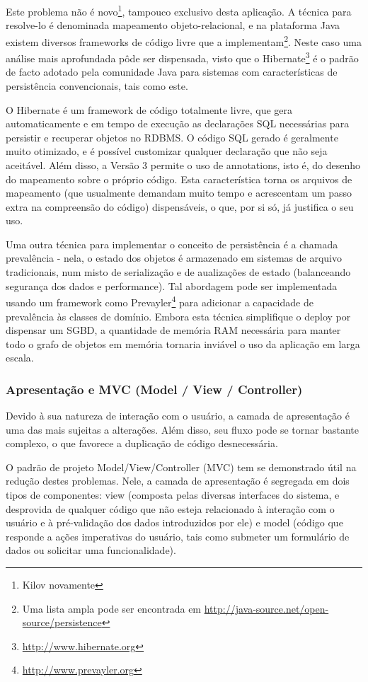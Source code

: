 \documentclass{abnt}
\begin{document}
Este problema não é novo\footnote{Kilov novamente}, tampouco exclusivo desta aplicação. A técnica para resolve-lo é denominada mapeamento objeto-relacional, e na plataforma Java existem diversos frameworks de código livre que a implementam\footnote{Uma lista ampla pode ser encontrada em \url{http://java-source.net/open-source/persistence}}. Neste caso uma análise mais aprofundada pôde ser dispensada, visto que o Hibernate\footnote{\url{http://www.hibernate.org}} é o padrão de facto adotado pela comunidade Java para sistemas com características de persistência convencionais, tais como este.

O Hibernate é um framework de código totalmente livre, que gera automaticamente e em tempo de execução as declarações SQL necessárias para persistir e recuperar objetos no RDBMS. O código SQL gerado é geralmente muito otimizado, e é possível customizar qualquer declaração que não seja aceitável. Além disso, a Versão 3 permite o uso de annotations, isto é, do desenho do mapeamento sobre o próprio código. Esta característica torna os arquivos de mapeamento (que usualmente demandam muito tempo e acrescentam um passo extra na compreensão do código) dispensáveis, o que, por si só, já justifica o seu uso.

Uma outra técnica para implementar o conceito de persistência é a chamada prevalência - nela, o estado dos objetos é armazenado em sistemas de arquivo tradicionais, num misto de serialização e de aualizações de estado (balanceando segurança dos dados e performance). Tal abordagem pode ser implementada usando um framework como Prevayler\footnote{\url{http://www.prevayler.org}} para adicionar a capacidade de prevalência às classes de domínio. Embora esta técnica simplifique o deploy por dispensar um SGBD, a quantidade de memória RAM necessária para manter todo o grafo de objetos em memória tornaria inviável o uso da aplicação em larga escala.

\subsubsection{Apresentação e MVC (Model / View / Controller)}

Devido à sua natureza de interação com o usuário, a camada de apresentação é uma das mais sujeitas a alterações. Além disso, seu fluxo pode se tornar bastante complexo, o que favorece a duplicação de código desnecessária.

O padrão de projeto Model/View/Controller (MVC) tem se demonstrado útil na redução destes problemas. Nele, a camada de apresentação é segregada em dois tipos de componentes: view (composta pelas diversas interfaces do sistema, e desprovida de qualquer código que não esteja relacionado à interação com o usuário e à pré-validação dos dados introduzidos por ele) e model (código que responde a ações imperativas do usuário, tais como submeter um formulário de dados ou solicitar uma funcionalidade).
\end{document}
